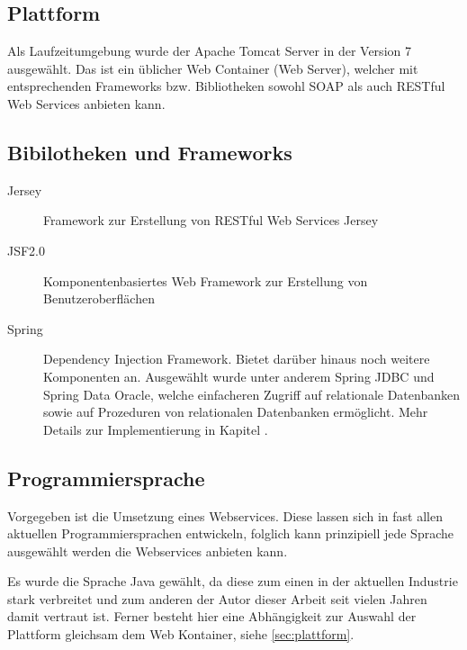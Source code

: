 \subsection{Plattform}  \label{sec:plattform}
Als Laufzeitumgebung wurde der Apache Tomcat Server in der Version 7 ausgewählt. Das ist ein üblicher Web Container (Web Server), welcher mit entsprechenden Frameworks bzw. Bibliotheken sowohl \gls{SOAP} als auch RESTful Web Services anbieten kann. 

\subsection{Bibilotheken und Frameworks} \label{bibliotheken_und_frameworks}
\begin{description}

\item[Jersey] Framework zur Erstellung von RESTful Web Services \gls{Jersey}
\item[JSF2.0] Komponentenbasiertes Web Framework zur Erstellung von Benutzeroberflächen 
\item[Spring] Dependency Injection Framework. Bietet darüber hinaus noch weitere Komponenten an. Ausgewählt wurde unter anderem \gls{Spring} JDBC und \gls{Spring} Data Oracle, welche einfacheren Zugriff auf relationale Datenbanken sowie auf Prozeduren von relationalen Datenbanken ermöglicht. Mehr Details zur Implementierung in Kapitel .  
    
\end{description}


\subsection{Programmiersprache}
Vorgegeben ist die Umsetzung eines Webservices. Diese lassen sich in fast allen aktuellen Programmiersprachen entwickeln, folglich kann prinzipiell jede Sprache ausgewählt werden die Webservices anbieten kann.  

Es wurde die Sprache Java gewählt, da diese zum einen in der aktuellen Industrie stark verbreitet und zum anderen der Autor dieser Arbeit seit vielen Jahren damit vertraut ist. Ferner besteht hier eine Abhängigkeit zur Auswahl der Plattform gleichsam dem Web Kontainer, siehe \autoref{sec:plattform}. 

